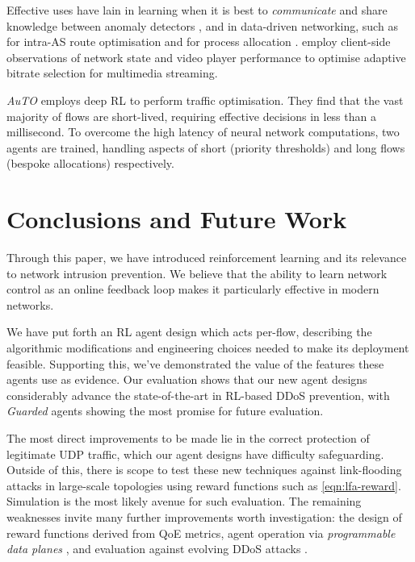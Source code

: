 \documentclass[10pt, times, conference, letterpaper]{IEEEtran}
\begin{document}
Effective uses have lain in learning when it is best to \emph{communicate} and share knowledge between anomaly detectors \cite{DBLP:conf/paisi/XuSH07}, and in data-driven networking, such as for intra-AS route optimisation \cite{DBLP:conf/hotnets/ValadarskySST17} and for process allocation \cite{DBLP:conf/hotnets/MaoAMK16}.
\Textcite{DBLP:conf/sigcomm/MaoNA17} employ client-side observations of network state and video player performance to optimise adaptive bitrate selection for multimedia streaming.

\emph{AuTO} \cite{DBLP:conf/sigcomm/ChenL0L18} employs deep RL to perform traffic optimisation.
They find that the vast majority of flows are short-lived, requiring effective decisions in less than a millisecond.
To overcome the high latency of neural network computations, two agents are trained, handling aspects of short (priority thresholds) and long flows (bespoke allocations) respectively.


\section{Conclusions and Future Work}
Through this paper, we have introduced reinforcement learning and its relevance to network intrusion prevention.
We believe that the ability to learn network control as an online feedback loop makes it particularly effective in modern networks.

We have put forth an RL agent design which acts per-flow, describing the algorithmic modifications and engineering choices needed to make its deployment feasible.
Supporting this, we've demonstrated the value of the features these agents use as evidence.
Our evaluation shows that our new agent designs considerably advance the state-of-the-art in RL-based DDoS prevention, with \emph{Guarded} agents showing the most promise for future evaluation.

The most direct improvements to be made lie in the correct protection of legitimate UDP traffic, which our agent designs have difficulty safeguarding.
Outside of this, there is scope to test these new techniques against link-flooding attacks in large-scale topologies using reward functions such as \cref{eqn:lfa-reward}.
Simulation is the most likely avenue for such evaluation.
The remaining weaknesses invite many further improvements worth investigation: the design of reward functions derived from QoE metrics, agent operation via \emph{programmable data planes} \cite{DBLP:conf/ancs/JouetP17}, and evaluation against evolving DDoS attacks \cite{DBLP:conf/spw/KangGS16}.
\end{document}
